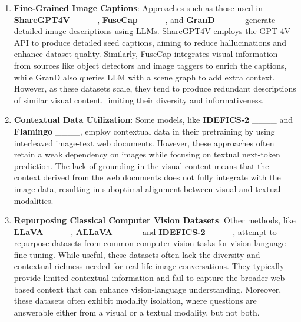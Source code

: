 \begin{enumerate}
    \item \textbf{Fine-Grained Image Captions}: Approaches such as those used in \textbf{ShareGPT4V} ____, \textbf{FuseCap} ____, and \textbf{GranD} ____ generate detailed image descriptions using LLMs. ShareGPT4V employs the GPT-4V API to produce detailed seed captions, aiming to reduce hallucinations and enhance dataset quality. Similarly, FuseCap integrates visual information from sources like object detectors and image taggers to enrich the captions, while GranD also queries LLM with a scene graph to add extra context. However, as these datasets scale, they tend to produce redundant descriptions of similar visual content, limiting their diversity and informativeness.
    \item \textbf{Contextual Data Utilization}: Some models, like \textbf{IDEFICS-2} ____ and \textbf{Flamingo} ____, employ contextual data in their pretraining by using interleaved image-text web documents. However, these approaches often retain a weak dependency on images while focusing on textual next-token prediction. The lack of grounding in the visual content means that the context derived from the web documents does not fully integrate with the image data, resulting in suboptimal alignment between visual and textual modalities.
    \item \textbf{Repurposing Classical Computer Vision Datasets}: Other methods, like \textbf{LLaVA} ____, \textbf{ALLaVA} ____ and \textbf{IDEFICS-2} ____, attempt to repurpose datasets from common computer vision tasks for vision-language fine-tuning. While useful, these datasets often lack the diversity and contextual richness needed for real-life image conversations. They typically provide limited contextual information and fail to capture the broader web-based context that can enhance vision-language understanding. Moreover, these datasets often exhibit modality isolation, where questions are answerable either from a visual or a textual modality, but not both.

    
\end{enumerate}

